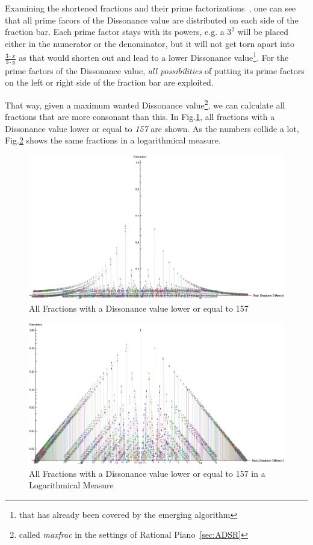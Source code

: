 \documentclass[12pt,a4paper,titlepage,oneside]{report}
\begin{document}
Examining the shortened fractions and their prime factorizations~\cite{bib:factorization}, one can see that all prime facors of the Dissonance value are distributed on each side of the fraction bar. Each prime factor stays with its powers, e.g. a $3^2$ will be placed either in the numerator or the denominator, but it will not get torn apart into $\frac{3 \cdot x}{3 \cdot y}$ as that would shorten out and lead to a lower Dissonance value\footnote{that has already been covered by the emerging algorithm}. For the prime factors of the Dissonance value, \emph{all possibilities} of putting its prime factors on the left or right side of the fraction bar are exploited.

That way, given a maximum wanted Dissonance value\footnote{called \emph{maxfrac} in the settings of Rational Piano~\ref{sec:ADSR}}, we can calculate all fractions that are more consonant than this. In Fig.\ref{fig:maxfrac_fractions}, all fractions with a Dissonance value lower or equal to \emph{157} are shown. As the numbers collide a lot, Fig.\ref{fig:maxfrac_fractions_log} shows the same fractions in a logarithmical measure.

\begin{figure}[!ht]
\includegraphics[width=\textwidth]{images/maxfrac_fractions.png}
\centering
\caption{All Fractions with a Dissonance value lower or equal to 157}
\label{fig:maxfrac_fractions}
\end{figure}

\begin{figure}[!ht]
\includegraphics[width=\textwidth]{images/maxfrac_fractions_log.png}
\centering
\caption{All Fractions with a Dissonance value lower or equal to 157 in a Logarithmical Measure}
\label{fig:maxfrac_fractions_log}
\end{figure}
\end{document}
